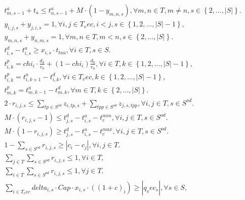 \begin{align}
  & t_{m , s - 1}^{a} + t_{a} \leq t_{n , s - 1}^{a} + M \cdot \left(1 - y_{m , n , s}\right) , \forall m , n \in {T} , m \neq n , s \in \left\{2 , \hdots , \left|S\right|\right\} . \tag{eq\_0013} \\
  & y_{i , j , s} + y_{j , i , s} = 1 , \forall i , j \in T_vec , i < j , s \in \left\{1 , 2 , \hdots , \left|S\right| - 1\right\} , \tag{eq\_0014} \\
  & y_{m , n , s} + y_{n , m , s} = 1 , \forall m , n \in {T} , m < n , s \in \left\{2 , \hdots , \left|S\right|\right\} . \tag{eq\_0015} \\
  & t_{i , s}^{d} - t_{i , s}^{a} \geq x_{i , s} \cdot t_{\mathit{tau}} , \forall i \in T , s \in S . \tag{eq\_0016} \\
  & t_{i , k}^{p} = \mathit{chi}_{i} \cdot \frac{d_{k}}{v_{h}} + \left(1 - \mathit{chi}_{i}\right) \frac{d_{k}}{v_{n}} , \forall i \in T , k \in \left\{1 , 2 , \hdots , \left|S\right| - 1\right\} , \tag{eq\_0017} \\
  & t_{i , k}^{p} = t_{i , k + 1}^{a} - t_{i , k}^{d} , \forall i \in T_vec , k \in \left\{1 , 2 , \hdots , \left|S\right| - 1\right\} , \tag{eq\_0018} \\
  & t_{m , k}^{p} = t_{m , k - 1}^{a} - t_{m , k}^{d} , \forall m \in {T} , k \in \left\{2 , \hdots , \left|S\right|\right\} . \tag{eq\_0019} \\
  & 2 \cdot r_{i , j , s} \leq \underset{tp \in S^{\mathit{od}}}{\sum} z_{i , tp , s} + \underset{tpp \in S^{\mathit{od}}}{\sum} z_{j , s , tpp} , \forall i , j \in T , s \in S^{\mathit{od}} . \tag{eq\_0020} \\
  & M \cdot \left(r_{i , j , s} - 1\right) \leq t_{j , s}^{d} - t_{i , s}^{a} - t_{c}^{\mathit{min}} , \forall i , j \in T , s \in S^{\mathit{od}} . \tag{eq\_0021} \\
  & M \cdot \left(1 - r_{i , j , s}\right) \geq t_{j , s}^{d} - t_{i , s}^{a} - t_{c}^{\mathit{max}} , \forall i , j \in T , s \in S^{\mathit{od}} . \tag{eq\_0022} \\
  & 1 - \underset{s \in S^{\mathit{od}}}{\sum} r_{i , j , s} \geq \left|c_{i} - c_{j}\right| , \forall i , j \in T . \tag{eq\_0023} \\
  & \sum_{j \in T} \underset{s \in S^{\mathit{od}}}{\sum} r_{i , j , s} \leq 1 , \forall i \in T , \tag{eq\_0024} \\
  & \sum_{i \in T} \underset{s \in S^{\mathit{od}}}{\sum} r_{i , j , s} \leq 1 , \forall j \in T . \tag{eq\_0025} \\
  & \sum_{i \in T_vec} \mathit{delta}_{i , s} \cdot \mathit{Cap} \cdot x_{i , s} \cdot \left(\left(\right. 1 + c\right)_{i} \left.\right) \geq \left|\right. q_vec_{s} \left|\right. , \forall s \in S , \tag{eq\_0026} \\

\end{align}
